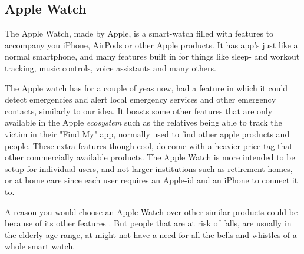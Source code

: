 \subsection{Apple Watch}

The Apple Watch\cite{apple_watch_fall_detection}, made by Apple, is a smart-watch filled with features to accompany you iPhone, AirPods or other Apple products. It has app's just like a normal smartphone, and many features built in for things like sleep- and workout tracking, music controls, voice assistants and many others.

The Apple watch has for a couple of yeas now, had a feature in which it could detect emergencies and alert local emergency services and other emergency contacts, similarly to our idea. It boasts some other features that are only available in the Apple \textit{ecosystem} such as the relatives being able to track the victim in their "Find My" app, normally used to find other apple products and people. These extra features though cool, do come with a heavier price tag that other commercially available products. The Apple Watch is more intended to be setup for individual users, and not larger institutions such as retirement homes, or at home care since each user requires an Apple-id and an iPhone to connect it to.


A reason you would choose an Apple Watch over other similar products could be because of its other features . But people that are at risk of falls, are usually in the elderly age-range, at might not have a need for all the bells and whistles of a whole smart watch.